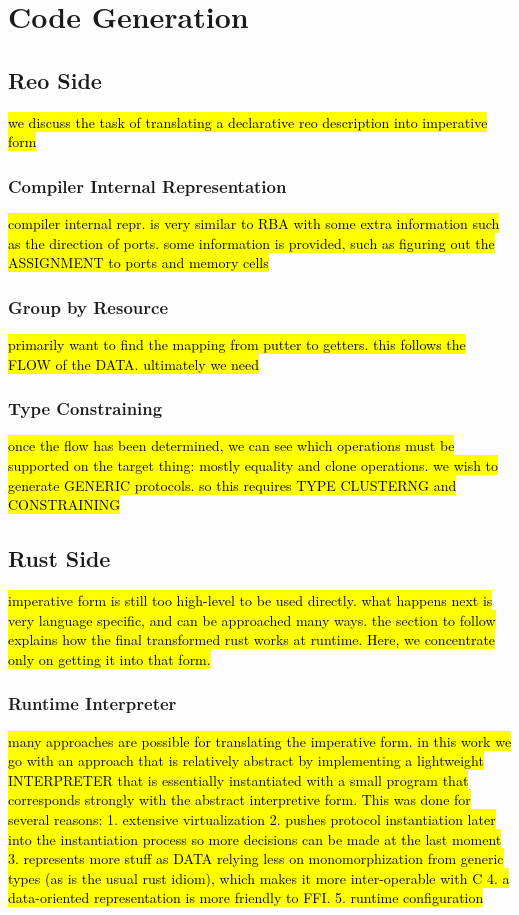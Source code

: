 \section{Code Generation}

\subsection{Reo Side}
\hl{we discuss the task of translating a declarative reo description into imperative form }

\subsubsection{Compiler Internal Representation}
\hl{compiler internal repr. is very similar to RBA with some extra information such as the direction of ports. some information is provided, such as figuring out the ASSIGNMENT to ports and memory cells}

\subsubsection{Group by Resource}
\hl{primarily want to find the mapping from putter to getters. this follows the FLOW of the DATA. ultimately we need}

\subsubsection{Type Constraining}
\hl{once the flow has been determined, we can see which operations must be supported on the target thing: mostly equality and clone operations. we wish to generate GENERIC protocols. so this requires TYPE CLUSTERNG and CONSTRAINING}

\subsection{Rust Side}
\hl{
imperative form is still too high-level to be used directly. what happens next is very language specific, and can be approached many ways. the section to follow explains how the final transformed rust works at runtime. Here, we concentrate only on getting it into that form.
}

\subsubsection{Runtime Interpreter}
\hl{many approaches are possible for translating the imperative form. in this work we go with an approach that is relatively abstract by implementing a lightweight INTERPRETER that is essentially instantiated with a small program that corresponds strongly with the abstract interpretive form. 
	This was done for several reasons: 
	1. extensive virtualization
	2. pushes protocol instantiation later into the instantiation process so more decisions can be made at the last moment
	3. represents more stuff as DATA relying less on monomorphization from generic types (as is the usual rust idiom), which makes it more inter-operable with C
	4. a data-oriented representation is more friendly to FFI. 
	5. runtime configuration}

